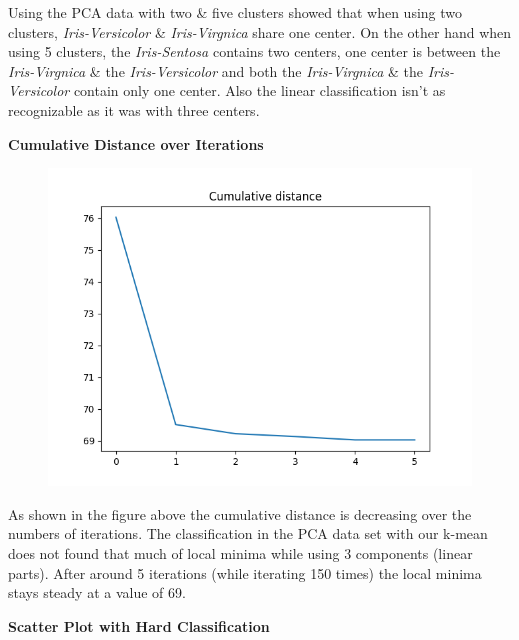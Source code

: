 \documentclass[a4paper]{article}
\begin{document}
\noindent
Using the PCA data with two \& five clusters showed that when using two clusters, \textit{Iris-Versicolor} \& \textit{Iris-Virgnica} share one center. On the other hand when using 5 clusters, the \textit{Iris-Sentosa} contains two centers, one center is between the \textit{Iris-Virgnica} \& the \textit{Iris-Versicolor} and both the \textit{Iris-Virgnica} \& the \textit{Iris-Versicolor} contain only one center. Also the linear classification isn't as recognizable as it was with three centers. \\

\newpage

{\large \textbf{Cumulative Distance over Iterations}} \\


\begin{figure}[htp]
\centering
\includegraphics[scale=0.5]{plots/CC_scenario3_cmpnt3.png}
  \label{fig:17}
\end{figure}

\noindent
As shown in the figure above the cumulative distance is decreasing over the numbers of iterations. The classification in the PCA data set with our k-mean does not found that much of local minima while using 3 components (linear parts). After around 5 iterations (while iterating 150 times) the local minima stays steady at a value of 69. \newline \newline

{\large \textbf{Scatter Plot with Hard Classification}} \\
\end{document}
